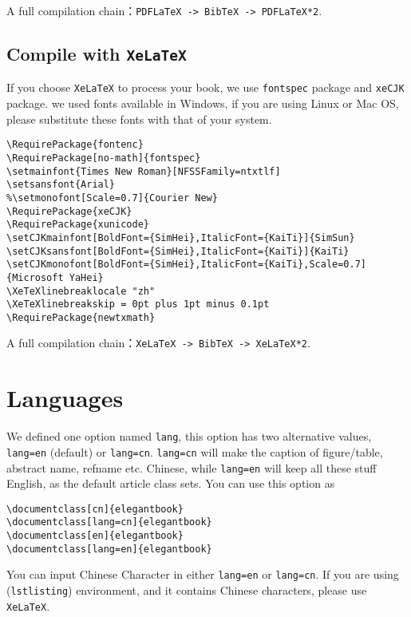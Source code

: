 \documentclass{elegantbook}
\begin{document}
A full compilation chain：\lstinline[breaklines]{PDFLaTeX -> BibTeX -> PDFLaTeX*2}.


\subsection[Compile with XeLaTeX]{Compile with \lstinline{XeLaTeX}}
If you choose \lstinline{XeLaTeX} to process your book, we use \lstinline{fontspec} package and \lstinline{xeCJK} package. we used fonts available in Windows, if you are using Linux or Mac OS, please substitute these fonts with that of your system.

\begin{lstlisting}[frame=single]
\RequirePackage{fontenc}
\RequirePackage[no-math]{fontspec}
\setmainfont{Times New Roman}[NFSSFamily=ntxtlf]
\setsansfont{Arial}
%\setmonofont[Scale=0.7]{Courier New}
\RequirePackage{xeCJK}
\RequirePackage{xunicode}
\setCJKmainfont[BoldFont={SimHei},ItalicFont={KaiTi}]{SimSun}
\setCJKsansfont[BoldFont={SimHei},ItalicFont={KaiTi}]{KaiTi}
\setCJKmonofont[BoldFont={SimHei},ItalicFont={KaiTi},Scale=0.7]{Microsoft YaHei}
\XeTeXlinebreaklocale "zh"
\XeTeXlinebreakskip = 0pt plus 1pt minus 0.1pt
\RequirePackage{newtxmath}
\end{lstlisting}

A full compilation chain：\lstinline[breaklines]{XeLaTeX -> BibTeX -> XeLaTeX*2}.


\section{Languages}
We defined one option named \lstinline{lang}, this option has two alternative values, \lstinline{lang=en} (default) or \lstinline{lang=cn}. \lstinline{lang=cn} will make the caption of figure/table, abstract name, refname etc. Chinese, while \lstinline{lang=en} will keep all these stuff English, as the default article class sets. You can use this option as

\begin{lstlisting}[frame=none]  
\documentclass[cn]{elegantbook} 
\documentclass[lang=cn]{elegantbook}
\documentclass[en]{elegantbook} 
\documentclass[lang=en]{elegantbook}
\end{lstlisting}

\begin{remark}
You can input Chinese Character in either \lstinline{lang=en} or \lstinline{lang=cn}. If you are using (\lstinline{lstlisting}) environment, and it contains Chinese characters, please use \lstinline{XeLaTeX}.
\end{remark}
\end{document}
